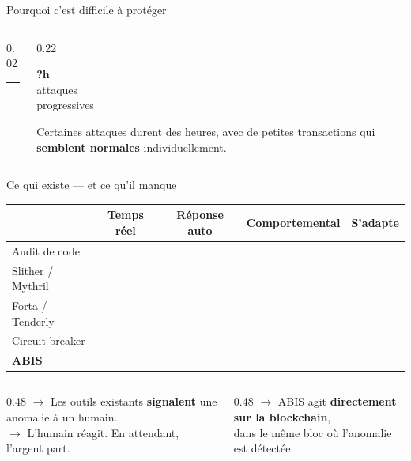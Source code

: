 \documentclass[aspectratio=169,12pt]{beamer}
\newcommand{\yes}{\textcolor{success}{\ding{51}}}
\newcommand{\no}{\textcolor{danger}{\ding{55}}}
\newcommand{\maybe}{\textcolor{accent}{\textbf{\texttildelow}}}
\begin{document}
\begin{frame}{Pourquoi c'est difficile à protéger}
\begin{columns}[T]
\begin{column}{0.02\textwidth}
      {\color{lightgray}\rule{0.5pt}{4cm}}
    \end{column}
    \begin{column}{0.22\textwidth}
      \begin{center}
        {\color{accent}\fontsize{30}{32}\selectfont\bfseries ?h}\\
        {\tiny\color{midgray} attaques\\progressives}
      \end{center}
      \vspace{0.3cm}
      {\small Certaines attaques durent des heures, avec de petites transactions qui \textbf{semblent normales} individuellement.}
    \end{column}
  \end{columns}
\end{frame}

\begin{frame}{Ce qui existe --- et ce qu'il manque}
  \vspace{0.3cm}
  \begin{center}
  \begin{tabular}{lcccc}
    \toprule
    & \small\textbf{Temps réel} & \small\textbf{Réponse auto} & \small\textbf{Comportemental} & \small\textbf{S'adapte} \\
    \midrule
    Audit de code      & \no  & \no  & \no  & \no \\
    Slither / Mythril  & \no  & \no  & \no  & \no \\
    Forta / Tenderly   & \yes & \no  & \maybe & \no \\
    Circuit breaker    & \yes & \yes & \no  & \no \\
    \midrule
    \textbf{ABIS}      & \yes & \yes & \yes & \yes \\
    \bottomrule
  \end{tabular}
  \end{center}
  \vspace{0.5cm}
  \begin{columns}
    \begin{column}{0.48\textwidth}
      {\color{danger}\small $\to$} Les outils existants \textbf{signalent} une anomalie à un humain.\\
      {\color{danger}\small $\to$} L'humain réagit. En attendant, l'argent part.
    \end{column}
    \begin{column}{0.48\textwidth}
      {\color{success}\small $\to$} ABIS agit \textbf{directement sur la blockchain},\\dans le même bloc où l'anomalie est détectée.
    \end{column}
  \end{columns}
\end{frame}
\end{document}
